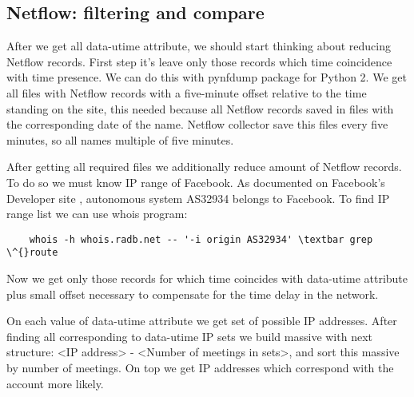  \subsection{Netflow: filtering and compare}
 After we get all data-utime attribute, we should start thinking about reducing Netflow records. First step it's leave only those records which time coincidence with time presence. We can do this with pynfdump package for Python 2. We get all files with Netflow records with a five-minute offset relative to the time standing on the site, this needed because all Netflow records saved in files with the corresponding date of the name. Netflow collector save this files every five minutes, so all names multiple of five minutes. \par After getting all required files we additionally reduce amount of Netflow records. To do so we must know IP range of Facebook. As documented on Facebook's Developer site \cite{fbDevelop}, autonomous system AS32934 belongs to Facebook. To find IP range list we can use whois program:
 \begin{lstlisting}
    whois -h whois.radb.net -- '-i origin AS32934' \textbar grep \^{}route
\end{lstlisting}
Now we get only those records for which time coincides with data-utime attribute plus small offset necessary to compensate for the time delay in the network. \par On each value of data-utime attribute we get set of possible IP addresses. After finding all corresponding to data-utime IP sets we build massive with next structure: <IP address> - <Number of meetings in sets>, and sort this massive by number of meetings. On top we get IP addresses which correspond with the account more likely.
